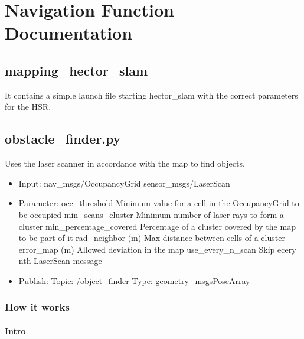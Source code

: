 \documentclass[main.tex]{subfiles}
\begin{document}
	\begingroup

	\renewcommand{\cleardoublepage}{}

	\renewcommand{\clearpage}{}

	\chapter{Navigation Function Documentation}

		
		\section{mapping\_hector\_slam}
		It contains a simple launch file starting hector\_slam with the correct parameters for the HSR.
		
		\section{obstacle\_finder.py}\label{met_obstacle_finder}
		Uses the laser scanner in accordance with the map to find objects.
		
		\begin{itemize}
			\item Input: 
				\subitem nav\_msgs/OccupancyGrid
				\subitem sensor\_msgs/LaserScan
			\item Parameter:
				\subitem occ\_threshold 
				Minimum value for a cell in the OccupancyGrid to be occupied
				\subitem min\_scans\_cluster
				Minimum number of laser rays to form a cluster
				\subitem min\_percentage\_covered
				Percentage of a cluster covered by the map to be part of it
				\subitem rad\_neighbor (m)
				Max distance between cells of a cluster
				\subitem error\_map (m)
				Allowed deviation in the map
				\subitem use\_every\_n\_scan
				Skip ecery nth LaserScan message 
			\item  Publish:
				\subitem Topic: /object\_finder
				\subitem Type: geometry\_msgsPoseArray
		\end{itemize}
	
		\subsection{How it works}
		
		\subsubsection{Intro}
		
\end{document}
